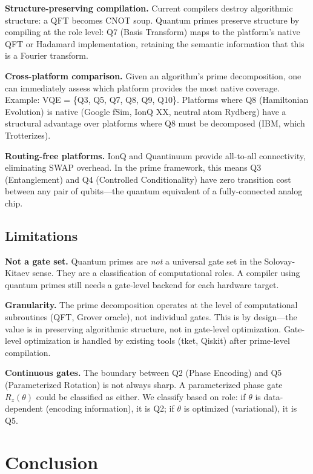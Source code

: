 \documentclass[11pt]{article}
\begin{document}
\textbf{Structure-preserving compilation.} Current compilers destroy algorithmic structure: a QFT becomes CNOT soup. Quantum primes preserve structure by compiling at the role level: Q7 (Basis Transform) maps to the platform's native QFT or Hadamard implementation, retaining the semantic information that this is a Fourier transform.

\textbf{Cross-platform comparison.} Given an algorithm's prime decomposition, one can immediately assess which platform provides the most native coverage. Example: VQE = \{Q3, Q5, Q7, Q8, Q9, Q10\}. Platforms where Q8 (Hamiltonian Evolution) is native (Google fSim, IonQ XX, neutral atom Rydberg) have a structural advantage over platforms where Q8 must be decomposed (IBM, which Trotterizes).

\textbf{Routing-free platforms.} IonQ and Quantinuum provide all-to-all connectivity, eliminating SWAP overhead. In the prime framework, this means Q3 (Entanglement) and Q4 (Controlled Conditionality) have zero transition cost between any pair of qubits---the quantum equivalent of a fully-connected analog chip.

\subsection{Limitations}

\textbf{Not a gate set.} Quantum primes are \textit{not} a universal gate set in the Solovay-Kitaev sense. They are a classification of computational roles. A compiler using quantum primes still needs a gate-level backend for each hardware target.

\textbf{Granularity.} The prime decomposition operates at the level of computational subroutines (QFT, Grover oracle), not individual gates. This is by design---the value is in preserving algorithmic structure, not in gate-level optimization. Gate-level optimization is handled by existing tools (tket, Qiskit) after prime-level compilation.

\textbf{Continuous gates.} The boundary between Q2 (Phase Encoding) and Q5 (Parameterized Rotation) is not always sharp. A parameterized phase gate $R_z(\theta)$ could be classified as either. We classify based on role: if $\theta$ is data-dependent (encoding information), it is Q2; if $\theta$ is optimized (variational), it is Q5.

\section{Conclusion}
\end{document}
